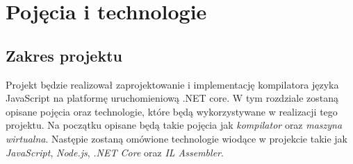 \chapter{Pojęcia i technologie}
\label{rozdzial1}

\section{Zakres projektu}

Projekt będzie realizował zaprojektowanie i implementację kompilatora języka JavaScript na platformę uruchomieniową .NET core. W tym rozdziale zostaną opisane pojęcia oraz technologie, które będą wykorzystywane w realizacji tego projektu. Na początku opisane będą takie pojęcia jak \textit{kompilator} oraz \textit{maszyna wirtualna}. Następie zostaną omówione technologie wiodące w projekcie takie jak \textit{JavaScript}, \textit{Node.js}, \textit{.NET Core} oraz \textit{IL Assembler}.


